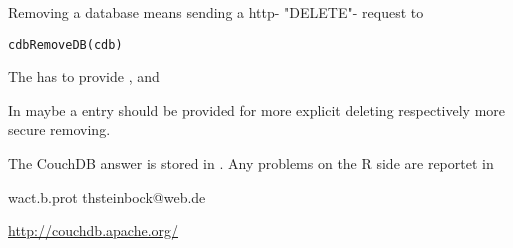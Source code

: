 \begin{Description}\relax
Removing a database means sending a http- "DELETE"- request to
\end{Description}
\begin{Usage}
\begin{verbatim}
cdbRemoveDB(cdb)
\end{verbatim}
\end{Usage}
\begin{Arguments}
\begin{ldescription}
\item[\code{cdb}] The  has to provide ,
 and  

\end{ldescription}
\end{Arguments}
\begin{Details}\relax
In  maybe a entry  should be provided
for more explicit deleting respectively more secure removing.
\end{Details}
\begin{Value}
\begin{ldescription}
\item[\code{cdb}] The CouchDB answer is stored in . Any
problems on the R side are reportet in 

\end{ldescription}
\end{Value}
\begin{Author}\relax
wact.b.prot
thsteinbock@web.de
\end{Author}
\begin{References}\relax
\url{  http://couchdb.apache.org/       }
\end{References}
\begin{SeeAlso}\relax
{}
\end{SeeAlso}


